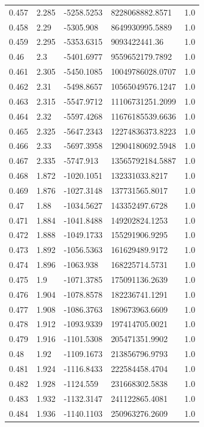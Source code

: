\begin{tabular}{lllll}
0.457 & 2.285 & -5258.5253 & 8228068882.8571 & 1.0 \\
0.458 & 2.29 & -5305.908 & 8649930995.5889 & 1.0 \\
0.459 & 2.295 & -5353.6315 & 9093422441.36 & 1.0 \\
0.46 & 2.3 & -5401.6977 & 9559652179.7892 & 1.0 \\
0.461 & 2.305 & -5450.1085 & 10049786028.0707 & 1.0 \\
0.462 & 2.31 & -5498.8657 & 10565049576.1247 & 1.0 \\
0.463 & 2.315 & -5547.9712 & 11106731251.2099 & 1.0 \\
0.464 & 2.32 & -5597.4268 & 11676185539.6636 & 1.0 \\
0.465 & 2.325 & -5647.2343 & 12274836373.8223 & 1.0 \\
0.466 & 2.33 & -5697.3958 & 12904180692.5948 & 1.0 \\
0.467 & 2.335 & -5747.913 & 13565792184.5887 & 1.0 \\
0.468 & 1.872 & -1020.1051 & 132331033.8217 & 1.0 \\
0.469 & 1.876 & -1027.3148 & 137731565.8017 & 1.0 \\
0.47 & 1.88 & -1034.5627 & 143352497.6728 & 1.0 \\
0.471 & 1.884 & -1041.8488 & 149202824.1253 & 1.0 \\
0.472 & 1.888 & -1049.1733 & 155291906.9295 & 1.0 \\
0.473 & 1.892 & -1056.5363 & 161629489.9172 & 1.0 \\
0.474 & 1.896 & -1063.938 & 168225714.5731 & 1.0 \\
0.475 & 1.9 & -1071.3785 & 175091136.2639 & 1.0 \\
0.476 & 1.904 & -1078.8578 & 182236741.1291 & 1.0 \\
0.477 & 1.908 & -1086.3763 & 189673963.6609 & 1.0 \\
0.478 & 1.912 & -1093.9339 & 197414705.0021 & 1.0 \\
0.479 & 1.916 & -1101.5308 & 205471351.9902 & 1.0 \\
0.48 & 1.92 & -1109.1673 & 213856796.9793 & 1.0 \\
0.481 & 1.924 & -1116.8433 & 222584458.4704 & 1.0 \\
0.482 & 1.928 & -1124.559 & 231668302.5838 & 1.0 \\
0.483 & 1.932 & -1132.3147 & 241122865.4081 & 1.0 \\
0.484 & 1.936 & -1140.1103 & 250963276.2609 & 1.0 \\

\end{tabular}
